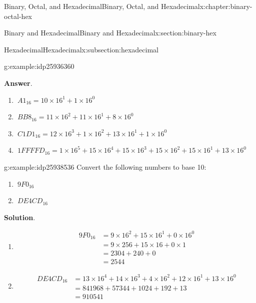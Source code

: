 \documentclass[twoside,10pt,]{book}
\newcommand{\blocktitlefont}{\relax}
\numberwithin{equation}{section}
\newcommand{\amp}{&}
\begin{document}
\begin{chapterptx}{Binary, Octal, and Hexadecimal}{}{Binary, Octal, and Hexadecimal}{}{}{x:chapter:binary-octal-hex}
\begin{sectionptx}{Binary and Hexadecimal}{}{Binary and Hexadecimal}{}{}{x:section:binary-hex}
\begin{subsectionptx}{Hexadecimal}{}{Hexadecimal}{}{}{x:subsection:hexadecimal}
\begin{example}{}{g:example:idp25936360}
\begin{enumerate}
\end{enumerate}
\par\smallskip%
\noindent\textbf{\blocktitlefont Answer}.\label{g:answer:idp25942248}{}\hypertarget{g:answer:idp25942248}{}\quad{}%
\begin{enumerate}
\item{}\(\displaystyle \ A1_{16}=10\times16^1+1\times16^0\)%
\item{}\(\displaystyle \ BB8_{16}=11\times16^2+11\times16^1+8\times16^0\)%
\item{}\(\displaystyle \ C1D1_{16}=12\times16^3+1\times16^2+13\times16^1+1\times16^0\)%
\item{}\(\displaystyle \ 1FFFFD_{16}=1\times16^5+15\times16^4+15\times16^3+15\times16^2+15\times16^1+13\times16^0\)%
\end{enumerate}
\end{example}
\begin{example}{}{g:example:idp25938536}%
Convert the following numbers to base 10: %
\begin{enumerate}
\item{}\(\displaystyle \ 9F0_{16}\)%
\item{}\(\displaystyle \ DE4CD_{16}\)%
\end{enumerate}
\par\smallskip%
\noindent\textbf{\blocktitlefont Solution}.\label{g:solution:idp25947624}{}\hypertarget{g:solution:idp25947624}{}\quad{}%
\begin{enumerate}
\item{}%
\begin{align*}
\ 9F0_{16} \amp = 9\times16^2+15\times16^1+0\times16^0\\
\amp = 9\times256+15\times16+0\times1\\
\amp= 2304+240+0\\
\amp = 2544
\end{align*}
%
\item{}%
\begin{align*}
\ DE4CD_{16} \amp = 13\times16^4+14\times16^3+4\times16^2+12\times16^1+13\times16^0\\
\amp = 841968+57344+1024+192+13\\
\amp = 910541
\end{align*}
%
\end{enumerate}
\end{example}
\end{subsectionptx}
%
%
\typeout{************************************************}
\typeout{************************************************}

\end{sectionptx}
\end{chapterptx}
\end{document}
